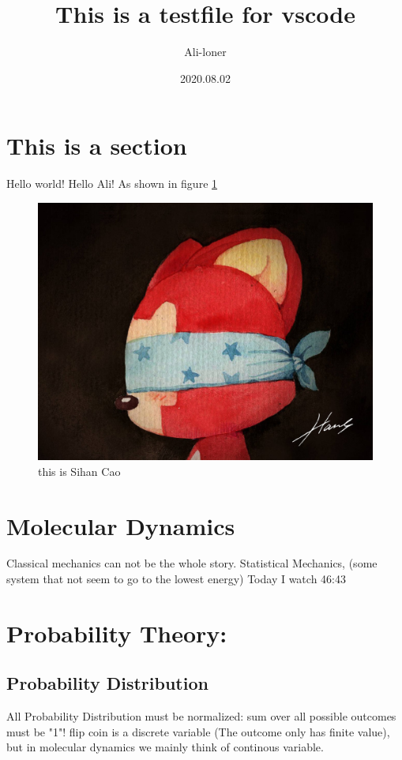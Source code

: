 \documentclass[a4paper]{article}
\title{\heiti\zihao{2} This is a testfile for vscode}
\author{\songti Ali-loner}
\date{2020.08.02}
\begin{document}
	\maketitle
	\thispagestyle{empty}

\begin{abstract}
	\lipsum[2]
\end{abstract}

\tableofcontents

\section{This is a section}
Hello world! Hello Ali! As shown in figure \ref{1}
\begin{figure}[htbp]
	\centering
	\includegraphics[scale=0.2]{Ali.jpg}
	\caption{this is Sihan Cao}
	\label{1}
\end{figure}

\section{Molecular Dynamics}
Classical mechanics can not be the whole story.
Statistical Mechanics, (some system that not seem to go to the lowest energy)
\bigskip
Today I watch 46:43
\bigskip

\section{Probability Theory:}
\subsection{Probability Distribution}
All Probability Distribution must be normalized: sum over all possible outcomes must be "1"!
flip coin is a discrete variable (The outcome only has finite value), but in molecular dynamics we mainly think of continous variable.
\end{document}
